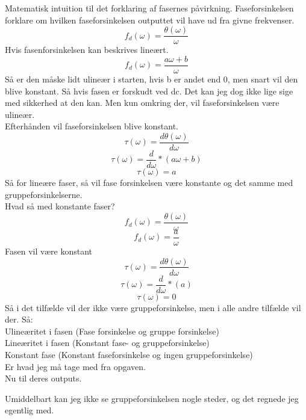\begin{Opgaver}
\begin{kapitel}
\begin{Opgave}
            Matematisk intuition til det forklaring af fasernes påvirkning.
            Faseforsinkelsen forklare om hvilken faseforsinkelsen outputtet vil have ud fra givne frekvenser.
            \[f_d(\omega) = \frac{\theta(\omega)}{\omega}\]
            Hvis fasenforsinkelsen kan beskrives lineært. 
            \[f_d(\omega) = \frac{a\omega + b}{\omega}\]
            Så er den måske lidt ulineær i starten, hvis b er andet end 0, men snart vil den blive konstant. 
            Så hvis fasen er forskudt ved dc. Det kan jeg dog ikke lige sige med sikkerhed at den kan. Men kun omkring der, vil faseforsinkelsen være ulineær.\\
            Efterhånden vil faseforsinkelsen blive konstant. \\
            \[\tau(\omega) = \frac{d\theta(\omega)}{d\omega}\]
            \[\tau(\omega) = \frac{d}{d\omega} * (a\omega + b)\]
            \[\tau(\omega) = a\]
            Så for lineære faser, så vil fase forsinkelsen være konstante og det samme med gruppeforsinkelserne.\\
            Hvad så med konstante faser? 
            \[f_d(\omega) = \frac{\theta(\omega)}{\omega}\]
            \[f_d(\omega) = \frac{a}{\omega}\]
            Fasen vil være konstant
            \[\tau(\omega) = \frac{d\theta(\omega)}{d\omega}\]
            \[\tau(\omega) = \frac{d}{d\omega} * (a)\]
            \[\tau(\omega) = 0\]
            Så i det tilfælde vil der ikke være gruppeforsinkelse, men i alle andre tilfælde vil der. Så: \\
            Ulineæritet i fasen (Fase forsinkelse og gruppe forsinkelse)\\
            Lineæritet i fasen (Konstant fase- og gruppeforsinkelse)\\
            Konstant fase       (Konstant faseforsinkelse og ingen gruppeforsinkelse)\\
            Er hvad jeg må tage med fra opgaven. \\ Nu til deres outputs. \\
            \vspace{160pt}
        
            Umiddelbart kan jeg ikke se gruppeforsinkelsen nogle steder, og det regnede jeg egentlig med.
            
        \end{Opgave}
    \end{kapitel}
\end{Opgaver}